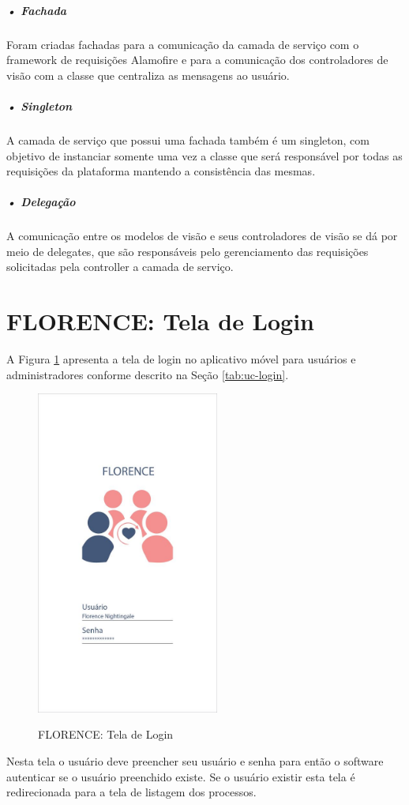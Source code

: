 \documentclass[portuguese,oneside]{tcc}
\begin{document}
\subparagraph{• Fachada}
Foram criadas fachadas para a comunicação da camada de serviço com o framework de requisições Alamofire e para a comunicação dos controladores de visão com a classe que centraliza as mensagens ao usuário.

\subparagraph{• Singleton}
A camada de serviço que possui uma fachada também é um singleton, com objetivo de instanciar somente uma vez a classe que será responsável por todas as requisições da plataforma mantendo a consistência das mesmas.

\subparagraph{• Delegação}
A comunicação entre os modelos de visão e seus controladores de visão se dá por meio de delegates, que são responsáveis pelo gerenciamento das requisições solicitadas pela controller a camada de serviço.

\section{FLORENCE: Tela de Login}
A Figura \ref{fig:app-login} apresenta a tela de login no aplicativo móvel para usuários e administradores conforme descrito na Seção \ref{tab:uc-login}.

\begin{figure}[htp]
\centering
\caption{FLORENCE: Tela de Login}
\includegraphics[width=6cm]{app-login}
\label{fig:app-login}
\end{figure}

Nesta tela o usuário deve preencher seu usuário e senha para então o software autenticar se o usuário preenchido existe. Se o usuário existir esta tela é redirecionada para a tela de listagem dos processos.  
\end{document}
